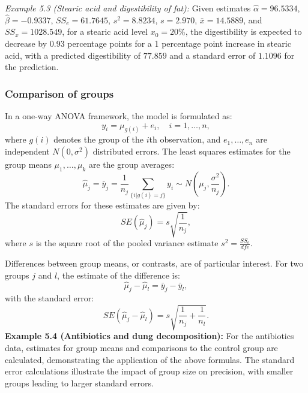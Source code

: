\documentclass{article}
\begin{document}
\textit{Example 5.3 (Stearic acid and digestibility of fat):} Given estimates \(\hat{\alpha} = 96.5334\), \(\hat{\beta} = -0.9337\), \(SS_e = 61.7645\), \(s^2 = 8.8234\), \(s = 2.970\), \(\bar{x} = 14.5889\), and \(SS_x = 1028.549\), for a stearic acid level \(x_0 = 20\%\), the digestibility is expected to decrease by 0.93 percentage points for a 1 percentage point increase in stearic acid, with a predicted digestibility of \(77.859\) and a standard error of \(1.1096\) for the prediction.

\subsubsection{Comparison of groups}
In a one-way ANOVA framework, the model is formulated as:
\begin{equation}
y_i = \mu_{g(i)} + e_i, \quad i = 1, \ldots, n,
\end{equation}
where \(g(i)\) denotes the group of the \(i\)th observation, and \(e_1, \ldots, e_n\) are independent \(N(0, \sigma^2)\) distributed errors. The least squares estimates for the group means \(\mu_1, \ldots, \mu_k\) are the group averages:
\begin{equation}
\hat{\mu}_j = \bar{y}_j = \frac{1}{n_j} \sum_{\{i | g(i) = j\}} y_i \sim N\left(\mu_j, \frac{\sigma^2}{n_j}\right).
\end{equation}
The standard errors for these estimates are given by:
\begin{equation}
SE(\hat{\mu}_j) = s \sqrt{\frac{1}{n_j}},
\end{equation}
where \(s\) is the square root of the pooled variance estimate \(s^2 = \frac{SS_e}{dfe}\).

Differences between group means, or contrasts, are of particular interest. For two groups \(j\) and \(l\), the estimate of the difference is:
\begin{equation}
\hat{\mu}_j - \hat{\mu}_l = \bar{y}_j - \bar{y}_l,
\end{equation}
with the standard error:
\begin{equation}
SE(\hat{\mu}_j - \hat{\mu}_l) = s \sqrt{\frac{1}{n_j} + \frac{1}{n_l}}. \tag{5.17}
\end{equation}
\textbf{Example 5.4 (Antibiotics and dung decomposition):} For the antibiotics data, estimates for group means and comparisons to the control group are calculated, demonstrating the application of the above formulas. The standard error calculations illustrate the impact of group size on precision, with smaller groups leading to larger standard errors.
\end{document}

